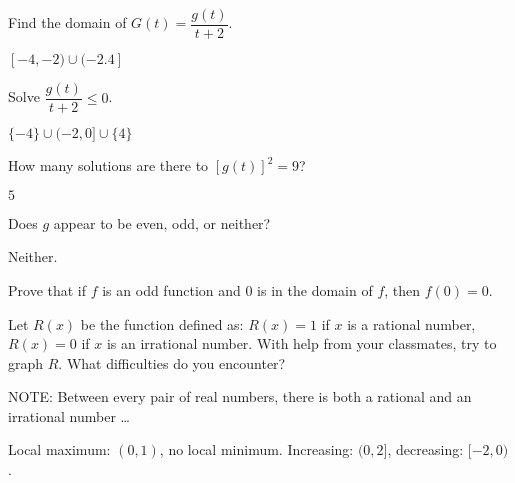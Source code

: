 \documentclass{ximera}
\begin{document}
\begin{problem}
Find the domain of $G(t) = \dfrac{g(t)}{t+2}$.
\begin{solution}
$[-4,-2) \cup (-2.4]$

\end{solution}

\end{problem}

\begin{problem}
Solve $\dfrac{g(t)}{t+2} \leq 0$.

\begin{solution}
$\{-4\} \cup (-2,0] \cup \{4\}$
\end{solution}

\end{problem}

\begin{problem}
How many solutions are there to $[g(t)]^2 = 9$?
\begin{solution}
$5$
\end{solution}

\end{problem}

\begin{problem}\label{usesecondfuncgraphlast}
Does $g$ appear to be even, odd, or neither?

\begin{solution}
Neither.

\end{solution}

\end{problem}

\begin{problem}
Prove that if $f$ is an odd function and $0$ is in the domain of $f$, then $f(0) = 0$.
\begin{solution}
\end{solution}

\end{problem}

\begin{problem}
Let $R(x)$ be the function defined as:  $R(x) = 1$ if $x$ is a rational number, $R(x) = 0$ if $x$ is an irrational number. With help from your classmates, try to graph $R$.  What difficulties do you encounter?

NOTE:  Between every pair of real numbers, there is both a rational and an irrational number \ldots


\begin{solution}
Local maximum: $(0,1)$, no local minimum.  Increasing: $(0,2]$, decreasing: $[-2,0)$.
\end{solution}

\end{problem}
\end{document}
